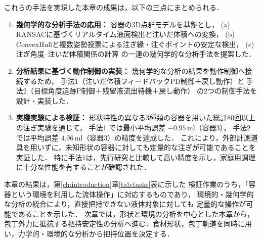 これらの手法を実現した本章の成果は，以下の三点にまとめられる．
\begin{enumerate}
  \item \textbf{幾何学的な分析手法の応用：} 
    容器の3D点群モデルを基盤とし，
    (a) RANSACに基づくリアルタイム液面検出と注いだ体積への変換，
    (b) ConvexHullと複数姿勢投票による注ぎ縁・注ぐポイントの安定な検出，
    (c) 注ぎ角度--注いだ体積関係の計算
    の一連の幾何学的な分析手法を提案した．
  \item \textbf{分析結果に基づく動作制御の実装：}
    幾何学的な分析の結果を動作制御へ接続するため，
    手法1（注いだ体積フィードバックPD制御＋戻し動作）と
    手法2（目標角度追跡P制御＋残留液流出待機＋戻し動作）
    の2つの制御手法を設計・実装した．
  \item \textbf{実機実験による検証：}
    形状特性の異なる3種類の容器を用いた総計80回以上の注ぎ実験を通じて，
    手法1 では最小平均誤差 $-0.95\,\mathrm{ml}$（容器3），
    手法2 では平均誤差 $4.96\,\mathrm{ml}$（容器3）の精度を達成した．
    これにより，外部計測道具を用いずに，未知形状の容器に対しても定量的な注ぎが可能であることを実証した．
    特に手法1は，先行研究と比較して高い精度を示し，家庭用調理に十分な性能を有することが確認された．
\end{enumerate}

本章の結果は，第\ref{ch:introduction}章\ref{tab:tasks}表に示した
検証作業のうち，「容器という環境を利用した流体操作」に対応するものであり，
環境的・幾何学的な分析の統合により，直接把持できない液体対象に対しても
定量的な操作が可能であることを示した．
次章では，形状と環境の分析を中心とした本章から，包丁外力に抵抗する把持安定性の分析へ進む．食材形状，包丁軌道を同時に用い，力学的・環境的な分析から把持位置を決定する．

